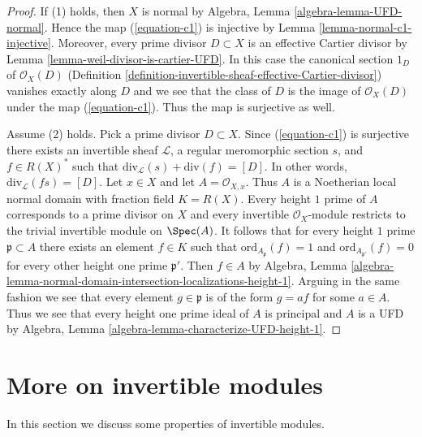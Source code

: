 \begin{proof}
If (1) holds, then $X$ is normal by
Algebra, Lemma \ref{algebra-lemma-UFD-normal}.
Hence the map (\ref{equation-c1}) is injective by
Lemma \ref{lemma-normal-c1-injective}. Moreover,
every prime divisor $D \subset X$ is an effective
Cartier divisor by Lemma \ref{lemma-weil-divisor-is-cartier-UFD}.
In this case the canonical section $1_D$ of $\mathcal{O}_X(D)$
(Definition \ref{definition-invertible-sheaf-effective-Cartier-divisor})
vanishes exactly along $D$ and we see that the class of $D$ is the
image of $\mathcal{O}_X(D)$ under the map (\ref{equation-c1}).
Thus the map is surjective as well.

\medskip\noindent
Assume (2) holds. Pick a prime divisor $D \subset X$.
Since (\ref{equation-c1}) is surjective there exists an invertible
sheaf $\mathcal{L}$, a regular meromorphic section $s$, and $f \in R(X)^*$
such that $\text{div}_\mathcal{L}(s) + \text{div}(f) = [D]$.
In other words, $\text{div}_\mathcal{L}(fs) = [D]$.
Let $x \in X$ and let $A = \mathcal{O}_{X, x}$. Thus $A$ is
a Noetherian local normal domain with fraction field $K = R(X)$.
Every height $1$ prime of $A$ corresponds to a prime divisor on $X$
and every invertible $\mathcal{O}_X$-module restricts to the
trivial invertible module on $\Spec(A)$. It follows that for every
height $1$ prime $\mathfrak p \subset A$ there exists an element $f \in K$
such that $\text{ord}_{A_\mathfrak p}(f) = 1$ and
$\text{ord}_{A_{\mathfrak p'}}(f) = 0$ for every other
height one prime $\mathfrak p'$. Then $f \in A$ by Algebra, Lemma
\ref{algebra-lemma-normal-domain-intersection-localizations-height-1}.
Arguing in the same fashion we see that every element $g \in \mathfrak p$
is of the form $g = af$ for some $a \in A$. Thus we see that every
height one prime ideal of $A$ is principal and $A$ is a UFD
by Algebra, Lemma \ref{algebra-lemma-characterize-UFD-height-1}.
\end{proof}







\section{More on invertible modules}
\label{section-invertible-modules}

\noindent
In this section we discuss some properties of invertible modules.

